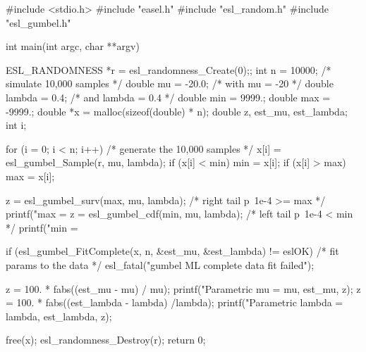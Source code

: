 \begin{cchunk}
#include <stdio.h>
#include "easel.h"
#include "esl_random.h"
#include "esl_gumbel.h"

int
main(int argc, char **argv)
{
  ESL_RANDOMNESS *r = esl_randomness_Create(0);;
  int     n         = 10000; 	/* simulate 10,000 samples */
  double  mu        = -20.0;       /* with mu = -20 */ 
  double  lambda    = 0.4;         /* and lambda = 0.4 */
  double  min       =  9999.;
  double  max       = -9999.;
  double *x         = malloc(sizeof(double) * n);
  double  z, est_mu, est_lambda;
  int     i;

  for (i = 0; i < n; i++)	/* generate the 10,000 samples */
    { 
      x[i] = esl_gumbel_Sample(r, mu, lambda);
      if (x[i] < min) min = x[i];
      if (x[i] > max) max = x[i];
    }

  z = esl_gumbel_surv(max, mu, lambda);           /* right tail p~1e-4 >= max */
  printf("max = %
  z = esl_gumbel_cdf(min, mu, lambda);             /* left tail p~1e-4 < min */
  printf("min = %

  if (esl_gumbel_FitComplete(x, n, &est_mu, &est_lambda) != eslOK) /* fit params to the data */
    esl_fatal("gumbel ML complete data fit failed");

  z = 100. * fabs((est_mu - mu) / mu);
  printf("Parametric mu     = %
	 mu, est_mu, z);
  z = 100. * fabs((est_lambda - lambda) /lambda);
  printf("Parametric lambda = %
	 lambda, est_lambda, z);

  free(x);
  esl_randomness_Destroy(r);
  return 0;
}
\end{cchunk}
